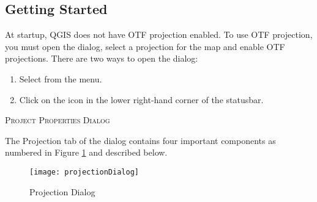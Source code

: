 \subsection{Getting Started}\label{label_projstart}

At startup, QGIS does not have OTF projection enabled. To use OTF
projection, you must open the  dialog, select a
projection for the map and enable OTF projections. There are two ways to open
the  dialog:

\begin{enumerate}
\item Select  from the  menu.
\item Click on the  icon in the lower right-hand corner of the
statusbar.
\end{enumerate}

\begin{Tip}
 \caption{\textsc{Project Properties Dialog}}
\end{Tip}

The Projection tab of the  dialog contains four important components as numbered in Figure
\ref{fig:projections} and described below.

\begin{figure}[ht]
   \begin{center}
   \caption{Projection Dialog}\label{fig:projections}\smallskip
   \texttt{[image: projectionDialog]}
\end{center}  
\end{figure}

